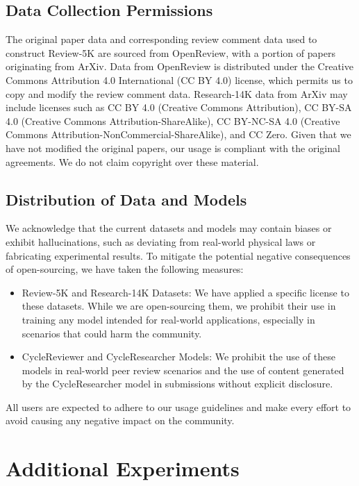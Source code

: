 \documentclass{article} %
\begin{document}
\subsection{Data Collection Permissions}
The original paper data and corresponding review comment data used to construct Review-5K are sourced from OpenReview, with a portion of papers originating from ArXiv. Data from OpenReview is distributed under the Creative Commons Attribution 4.0 International (CC BY 4.0) license, which permits us to copy and modify the review comment data. Research-14K data from ArXiv may include licenses such as CC BY 4.0 (Creative Commons Attribution), CC BY-SA 4.0 (Creative Commons Attribution-ShareAlike), CC BY-NC-SA 4.0 (Creative Commons Attribution-NonCommercial-ShareAlike), and CC Zero. Given that we have not modified the original papers, our usage is compliant with the original agreements. We do not claim copyright over these material.

\subsection{Distribution of Data and Models}
We acknowledge that the current datasets and models may contain biases or exhibit hallucinations, such as deviating from real-world physical laws or fabricating experimental results. To mitigate the potential negative consequences of open-sourcing, we have taken the following measures:

\begin{itemize}
    \item Review-5K and Research-14K Datasets: We have applied a specific license to these datasets. While we are open-sourcing them, we prohibit their use in training any model intended for real-world applications, especially in scenarios that could harm the community.
    \item CycleReviewer and CycleResearcher Models: We prohibit the use of these models in real-world peer review scenarios and the use of content generated by the CycleResearcher model in submissions without explicit disclosure.
\end{itemize}


All users are expected to adhere to our usage guidelines and make every effort to avoid causing any negative impact on the community.

\section{Additional Experiments}
\end{document}
